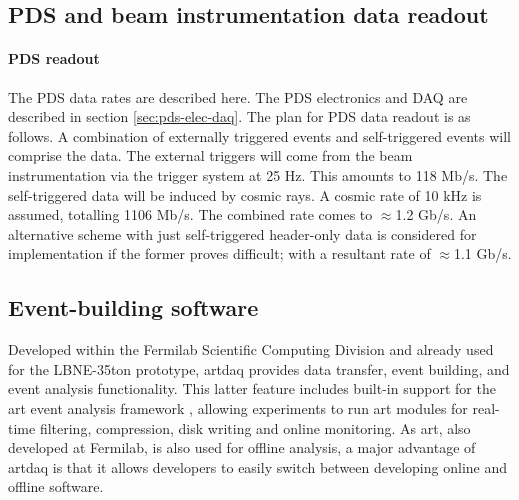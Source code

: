\subsection{PDS and beam instrumentation data readout}

\paragraph{PDS readout} 
\label{subsec:pds-readout}
The PDS data rates are described here.  The PDS electronics and DAQ are
described in section \ref{sec:pds-elec-daq}.  The plan for PDS data
readout is as follows.  A combination of externally triggered events
and self-triggered events will comprise the data.  The external triggers
will come from the beam instrumentation via the trigger system at 25 Hz.
This amounts to 118 Mb/s.  The self-triggered data
will be induced by cosmic rays.  A cosmic rate of 10 kHz is assumed,
totalling 1106 Mb/s.
The combined rate comes to $\approx$1.2 Gb/s.  An alternative scheme with
just self-triggered header-only data is considered for implementation if
the former proves difficult; with a resultant rate of $\approx$1.1 Gb/s.


\subsection{Event-building software }

Developed within the Fermilab Scientific Computing Division and
already used for the LBNE-35ton prototype, artdaq provides data
transfer, event building, and event analysis functionality. This
latter feature includes built-in support for the art event analysis
framework \cite{fnal:art}, allowing experiments to run art modules for real-time
filtering, compression, disk writing and online monitoring. As art,
also developed at Fermilab, is also used for offline analysis, a major
advantage of artdaq is that it allows developers to easily switch
between developing online and offline software.

